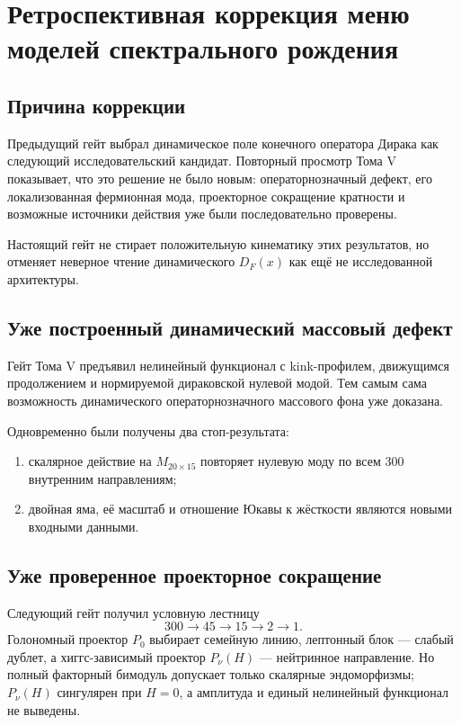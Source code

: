 \chapter{Ретроспективная коррекция меню моделей спектрального рождения}
\label{ch:v6-spectral-transition-candidate-menu-retrospective-correction-gate}

\section{Причина коррекции}

Предыдущий гейт выбрал динамическое поле конечного оператора Дирака как
следующий исследовательский кандидат. Повторный просмотр Тома V показывает,
что это решение не было новым: операторнозначный дефект, его локализованная
фермионная мода, проекторное сокращение кратности и возможные источники
действия уже были последовательно проверены.

Настоящий гейт не стирает положительную кинематику этих результатов, но
отменяет неверное чтение динамического $D_F(x)$ как ещё не исследованной
архитектуры.

\section{Уже построенный динамический массовый дефект}

Гейт Тома V
предъявил нелинейный функционал с kink-профилем, движущимся продолжением и
нормируемой дираковской нулевой модой. Тем самым сама возможность
динамического операторнозначного массового фона уже доказана.

Одновременно были получены два стоп-результата:
\begin{enumerate}
 \item скалярное действие на $M_{20\times15}$ повторяет нулевую моду по
 всем $300$ внутренним направлениям;
 \item двойная яма, её масштаб и отношение Юкавы к жёсткости являются
 новыми входными данными.
\end{enumerate}

\section{Уже проверенное проекторное сокращение}

Следующий гейт
получил условную лестницу
\begin{equation}
 300\longrightarrow45\longrightarrow15\longrightarrow2\longrightarrow1.
\end{equation}
Голономный проектор $P_0$ выбирает семейную линию, лептонный блок --- слабый
дублет, а хиггс-зависимый проектор $P_\nu(H)$ --- нейтринное направление.
Но полный факторный бимодуль допускает только скалярные эндоморфизмы;
$P_\nu(H)$ сингулярен при $H=0$, а амплитуда и единый нелинейный
функционал не выведены.

